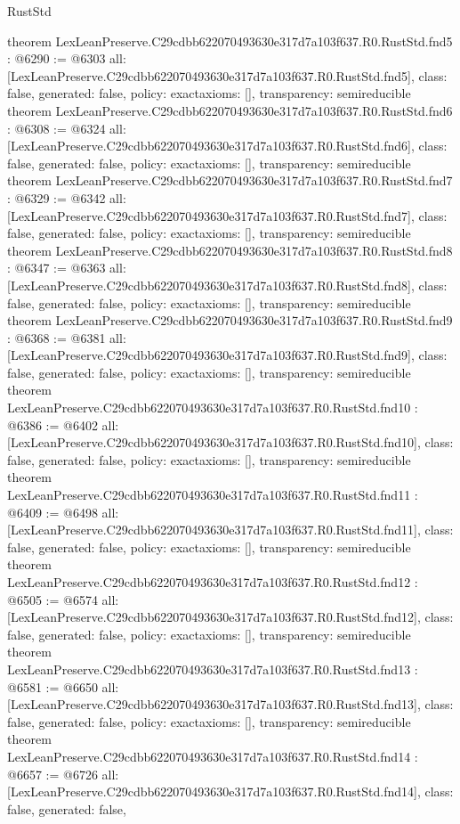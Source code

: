 \begin{lexlean}{RustStd}
\begin{coremodule}
{}
theorem LexLeanPreserve.C29cdbb622070493630e317d7a103f637.R0.RustStd.fnd5 : @6290 := @6303 {
  all: [LexLeanPreserve.C29cdbb622070493630e317d7a103f637.R0.RustStd.fnd5],
  class: false,
  generated: false,
  policy: exact{axioms: []},
  transparency: semireducible
}
theorem LexLeanPreserve.C29cdbb622070493630e317d7a103f637.R0.RustStd.fnd6 : @6308 := @6324 {
  all: [LexLeanPreserve.C29cdbb622070493630e317d7a103f637.R0.RustStd.fnd6],
  class: false,
  generated: false,
  policy: exact{axioms: []},
  transparency: semireducible
}
theorem LexLeanPreserve.C29cdbb622070493630e317d7a103f637.R0.RustStd.fnd7 : @6329 := @6342 {
  all: [LexLeanPreserve.C29cdbb622070493630e317d7a103f637.R0.RustStd.fnd7],
  class: false,
  generated: false,
  policy: exact{axioms: []},
  transparency: semireducible
}
theorem LexLeanPreserve.C29cdbb622070493630e317d7a103f637.R0.RustStd.fnd8 : @6347 := @6363 {
  all: [LexLeanPreserve.C29cdbb622070493630e317d7a103f637.R0.RustStd.fnd8],
  class: false,
  generated: false,
  policy: exact{axioms: []},
  transparency: semireducible
}
theorem LexLeanPreserve.C29cdbb622070493630e317d7a103f637.R0.RustStd.fnd9 : @6368 := @6381 {
  all: [LexLeanPreserve.C29cdbb622070493630e317d7a103f637.R0.RustStd.fnd9],
  class: false,
  generated: false,
  policy: exact{axioms: []},
  transparency: semireducible
}
theorem LexLeanPreserve.C29cdbb622070493630e317d7a103f637.R0.RustStd.fnd10 : @6386 := @6402 {
  all: [LexLeanPreserve.C29cdbb622070493630e317d7a103f637.R0.RustStd.fnd10],
  class: false,
  generated: false,
  policy: exact{axioms: []},
  transparency: semireducible
}
theorem LexLeanPreserve.C29cdbb622070493630e317d7a103f637.R0.RustStd.fnd11 : @6409 := @6498 {
  all: [LexLeanPreserve.C29cdbb622070493630e317d7a103f637.R0.RustStd.fnd11],
  class: false,
  generated: false,
  policy: exact{axioms: []},
  transparency: semireducible
}
theorem LexLeanPreserve.C29cdbb622070493630e317d7a103f637.R0.RustStd.fnd12 : @6505 := @6574 {
  all: [LexLeanPreserve.C29cdbb622070493630e317d7a103f637.R0.RustStd.fnd12],
  class: false,
  generated: false,
  policy: exact{axioms: []},
  transparency: semireducible
}
theorem LexLeanPreserve.C29cdbb622070493630e317d7a103f637.R0.RustStd.fnd13 : @6581 := @6650 {
  all: [LexLeanPreserve.C29cdbb622070493630e317d7a103f637.R0.RustStd.fnd13],
  class: false,
  generated: false,
  policy: exact{axioms: []},
  transparency: semireducible
}
theorem LexLeanPreserve.C29cdbb622070493630e317d7a103f637.R0.RustStd.fnd14 : @6657 := @6726 {
  all: [LexLeanPreserve.C29cdbb622070493630e317d7a103f637.R0.RustStd.fnd14],
  class: false,
  generated: false,
}
\end{coremodule}
\end{lexlean}
